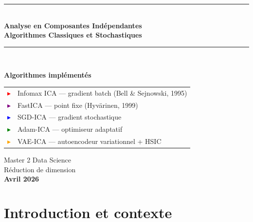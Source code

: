 \documentclass[12pt, a4paper]{article}
\begin{document}

\begin{titlepage}
  \centering
  \vspace*{2cm}
  {\color{accent}\rule{\linewidth}{1.5pt}}\\[0.8em]
  {\Huge\bfseries\color{accent}
    Analyse en Composantes Indépendantes\\[0.4em]
    \large Algorithmes Classiques et Stochastiques
  }\\[0.6em]
  {\color{accent}\rule{\linewidth}{1.5pt}}\\[2cm]

  \begin{tcolorbox}[colback=accent!5, colframe=accent, arc=5pt,
                    width=0.85\linewidth]
    \centering
    \textbf{Algorithmes implémentés}\\[0.5em]
    \begin{tabular}{ll}
      \textcolor{red}{$\blacktriangleright$} & Infomax ICA — gradient batch (Bell \& Sejnowski, 1995) \\
      \textcolor{purple}{$\blacktriangleright$} & FastICA — point fixe (Hyvärinen, 1999) \\
      \textcolor{blue}{$\blacktriangleright$} & SGD-ICA — gradient stochastique \\
      \textcolor{green}{$\blacktriangleright$} & Adam-ICA — optimiseur adaptatif \\
      \textcolor{orange}{$\blacktriangleright$} & VAE-ICA — autoencodeur variationnel + HSIC \\
    \end{tabular}
  \end{tcolorbox}

  \vfill
  {\large Master 2 Data Science\\[0.3em]
   Réduction de dimension\\[0.3em]
   \textbf{Avril 2026}}
\end{titlepage}

\tableofcontents
\newpage

\section{Introduction et contexte}
\end{document}
